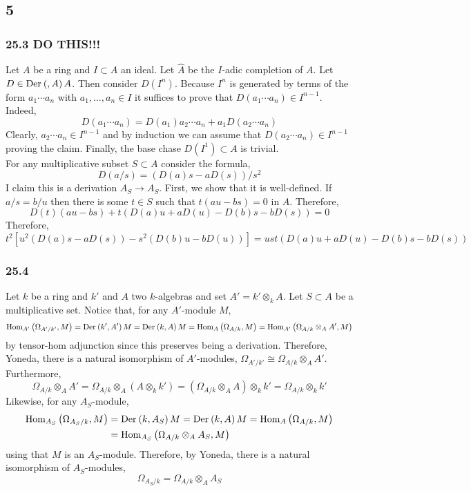 \documentclass[12pt]{article}
\begin{document}
\subsection{5}

\subsubsection{25.3 DO THIS!!!}

Let $A$ be a ring and $I \subset A$ an ideal. Let $\hat{A}$ be the $I$-adic completion of $A$. Let $D \in \mathrm{Der}_{} \left( , A \right){A}$. Then consider $D(I^n)$. Because $I^n$ is generated by terms of the form $a_1 \cdots a_n$ with $a_1, \dots, a_n \in I$ it suffices to prove that $D(a_1 \cdots a_n) \in I^{n-1}$. Indeed, 
\[ D(a_1 \cdots a_n) = D(a_1) a_2 \cdots a_n + a_1 D(a_2 \cdots a_n) \]
Clearly, $a_2 \cdots a_n \in I^{n-1}$ and by induction we can assume that $D(a_2 \cdots a_n) \in I^{n-1}$ proving the claim. Finally, the base chase $D(I^1) \subset A$ is trivial.
\bigskip\\
For any multiplicative subset $S \subset A$ consider the formula,
\[ D(a/s) = (D(a)s - a D(s))/s^2 \]
I claim this is a derivation $A_S \to A_S$. First, we show that it is well-defined. If $a/s = b/u$ then there is some $t \in S$ such that $t(au - bs) = 0$ in $A$. Therefore,
\[ D(t) (au - bs) + t (D(a) u + a D(u) - D(b) s - b D(s)) = 0 \]
Therefore, 
\[ t^2 [u^2 (D(a) s - a D(s)) - s^2(D(b) u - b D(u))] = ust (D(a) u + a D(u) - D(b) s - b D(s)) \]

\subsubsection{25.4}

Let $k$ be a ring and $k'$ and $A$ two $k$-algebras and set $A' = k' \otimes_k A$. Let $S \subset A$ be a multiplicative set. Notice that, for any $A'$-module $M$,
\[ \mathrm{Hom}_{A'} \left( \Omega_{A'/k'}, M \right) = \mathrm{Der}_{} \left( k', A' \right){M} = \mathrm{Der}_{} \left( k, A \right){M} = \mathrm{Hom}_{A} \left( \Omega_{A/k}, M \right) = \mathrm{Hom}_{A'} \left( \Omega_{A/k} \otimes_A A', M \right) \]
by tensor-hom adjunction since this preserves being a derivation. Therefore, Yoneda, there is a natural isomorphism of $A'$-modules, $\Omega_{A'/k'} \cong \Omega_{A/k} \otimes_A A'$. Furthermore,
\[ \Omega_{A/k} \otimes_A A' = \Omega_{A/k} \otimes_A (A \otimes_k k') = (\Omega_{A/k} \otimes_A A) \otimes_k k' = \Omega_{A/k} \otimes_k k' \]
Likewise, for any $A_S$-module,
\begin{align*}
\mathrm{Hom}_{A_S} \left( \Omega_{A_S/k}, M \right) & = \mathrm{Der}_{} \left( k, A_S \right){M} = \mathrm{Der}_{} \left( k, A \right){M} = \mathrm{Hom}_{A} \left( \Omega_{A/k}, M \right) 
\\
& = \mathrm{Hom}_{A_S} \left( \Omega_{A/k} \otimes_A A_S, M \right)
\end{align*}
using that $M$ is an $A_S$-module. Therefore, by Yoneda, there is a natural isomorphism of $A_S$-modules,
\[ \Omega_{A_S / k} = \Omega_{A/k} \otimes_A A_S \]
\end{document}
